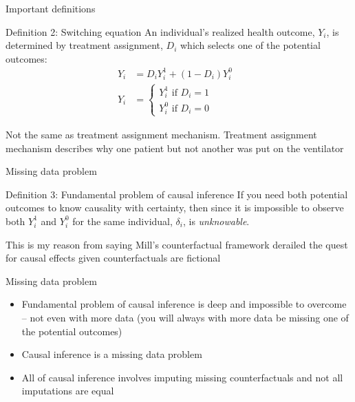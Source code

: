\documentclass{beamer}
\begin{document}
\begin{frame}{Important definitions}


    \begin{block}{Definition 2: Switching equation}
      An individual's realized health outcome, $Y_i$, is determined by treatment assignment, $D_i$ which selects one of the potential outcomes:
      \begin{eqnarray*}
        Y_i& = D_iY^1_i+(1-D_i)Y^0_i& \\
        Y_i& = \begin{cases}
          Y^1_i\text{ if }D_i=1 \\
          Y^0_i\text{ if }D_i=0
        \end{cases}
      \end{eqnarray*}
    \end{block}
    
    Not the same as treatment assignment mechanism.  Treatment assignment mechanism describes why one patient but not another was put on the ventilator

\end{frame}


\begin{frame}{Missing data problem}


    \begin{block}{Definition 3: Fundamental problem of causal inference}
      If you need both potential outcomes to know causality with certainty, then since it is impossible to observe both $Y_i^1$ and $Y_i^0$ for the same individual, $\delta_i$, is \emph{unknowable}.
    \end{block}

This is my reason from saying Mill's counterfactual framework derailed the quest for causal effects given counterfactuals are fictional
    
\end{frame}

\begin{frame}{Missing data problem}


    
    \begin{itemize}
    \item Fundamental problem of causal inference is deep and impossible to overcome -- not even with more data (you will always with more data be missing one of the potential outcomes)
    \item Causal inference is a missing data problem 
    \item All of causal inference involves imputing missing counterfactuals and not all imputations are equal
  \end{itemize}

    
\end{frame}
\end{document}
